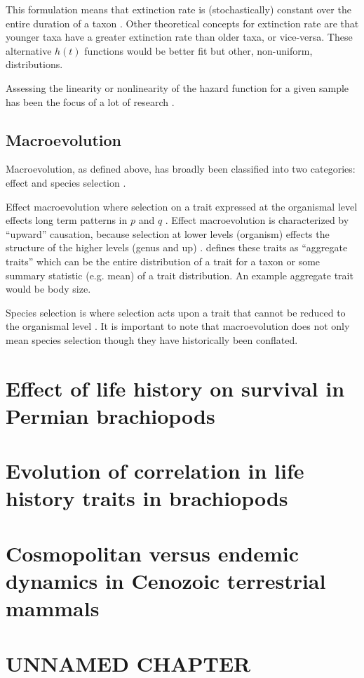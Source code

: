 \documentclass[12pt,letterpaper]{article}
\begin{document}
This formulation means that extinction rate is (stochastically) constant over the entire duration of a taxon \citep{VanValen1973}. Other theoretical concepts for extinction rate are that younger taxa have a greater extinction rate than older taxa, or vice-versa. These alternative \(h(t)\) functions would be better fit but other, non-uniform, distributions.

Assessing the linearity or nonlinearity of the hazard function for a given sample has been the focus of a lot of research \citep{Raup1975,Raup1978,Kitchell1991}.

\subsection{Macroevolution}
Macroevolution, as defined above, has broadly been classified into two categories: effect and species selection \citep{Jablonski2008a}. 

Effect macroevolution where selection on a trait expressed at the organismal level effects long term patterns in \(p\) and \(q\) \citep{Vrba1983,Jablonski2008a}. Effect macroevolution is characterized by ``upward'' causation, because selection at lower levels (organism) effects the structure of the higher levels (genus and up) \citep{Jablonski2008a}. \citet{Jablonski2008a} defines these traits as ``aggregate traits'' which can be the entire distribution of a trait for a taxon or some summary statistic (e.g. mean) of a trait distribution. An example aggregate trait would be body size. %

Species selection is where selection acts upon a trait that cannot be reduced to the organismal level \citep{Jablonski2007,Jablonski2008a}.
It is important to note that macroevolution does not only mean species selection \citep{Vrba1983} though they have historically been conflated.

\section{Effect of life history on survival in Permian brachiopods}

\section{Evolution of correlation in life history traits in brachiopods}

\section{Cosmopolitan versus endemic dynamics in Cenozoic terrestrial mammals}

\section{UNNAMED CHAPTER}



\end{document}
